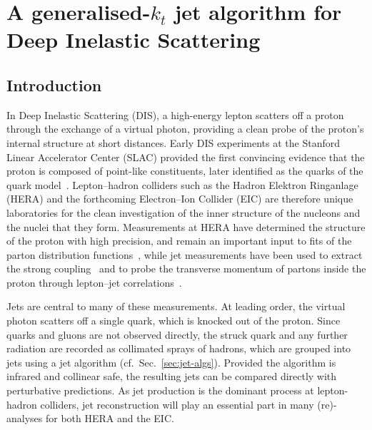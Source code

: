 \chapter{A generalised-$k_t$ jet algorithm for Deep Inelastic Scattering}
\label{chapter:DIS}

\section{Introduction}

In Deep Inelastic Scattering (DIS), a high-energy lepton scatters off a
proton through the exchange of a virtual photon, providing a clean
probe of the proton's internal structure at short distances. Early
DIS experiments at the Stanford Linear Accelerator Center (SLAC) provided the first convincing evidence that the
proton is composed of point-like constituents, later identified as the
quarks of the quark model~\cite{Bloom:1969kc, Breidenbach:1969kd}. Lepton--hadron colliders such as the Hadron Elektron
Ringanlage (HERA) and the forthcoming Electron--Ion Collider (EIC) are therefore
unique laboratories for the clean investigation of the inner structure
of the nucleons and the nuclei that they form. 
Measurements at HERA have determined the structure of the proton with high
precision, and remain an important input to fits of the parton distribution
functions~\cite{H1:2015ubc}, while jet measurements have been used to
extract the strong coupling~\cite{H1:2017bml} and to probe the transverse
momentum of partons inside the proton through lepton--jet
correlations~\cite{Liu:2018trl,H1:2021wkz}.

Jets are central to many of these measurements. At leading order, the
virtual photon scatters off a single quark, which is knocked out of the
proton. Since quarks and gluons are not observed directly, the struck
quark and any further radiation are recorded as collimated sprays of
hadrons, which are grouped into jets using a jet algorithm
(cf.\ Sec.~\ref{sec:jet-algs}). Provided the algorithm is infrared and
collinear safe, the resulting jets can be compared directly with
perturbative predictions. As jet production is the dominant process at
lepton-hadron colliders, jet reconstruction will play an essential part
in many (re)-analyses for both HERA and the EIC.


